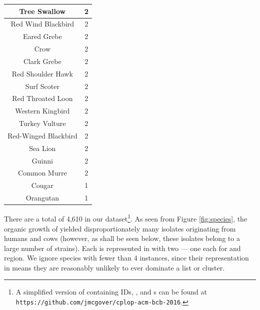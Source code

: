 \begin{longtable}{|c|c|}
Tree Swallow & 2 \\ \hline
Red Wind Blackbird & 2 \\ \hline
Eared Grebe & 2 \\ \hline
Crow & 2 \\ \hline
Clark Grebe & 2 \\ \hline
Red Shoulder Hawk & 2 \\ \hline
Surf Scoter & 2 \\ \hline
Red Throated Loon & 2 \\ \hline
Western Kingbird & 2 \\ \hline
Turkey Vulture & 2 \\ \hline
Red-Winged Blackbird & 2 \\ \hline
Sea Lion & 2 \\ \hline
Guinni & 2 \\ \hline
Common Murre & 2 \\ \hline
Cougar & 1 \\ \hline
Orangutan & 1 \\ \hline

\end{longtable}

There are a total of 4,610 \isols{} in our dataset\footnote{A simplified version of \cplop{} containing \isol{} IDs, \spec{}, and \zscore{}s can be found at \texttt{https://github.com/jmcgover/cplop-acm-bcb-2016}.}. 
As seen from Figure \ref{fig:species}, the organic growth of \cplop{} yielded disproportionately many \ecoli{} isolates originating
from humans and cows (however, as shall be seen below, these isolates belong to a large number of strains). Each \isol{} is represented in \cplop{} with two \pyros{} ---  one each for  and  
region.
We ignore species with fewer than 4 instances, since their representation in \cplop{} means they are reasonably unlikely to ever dominate a \knnlong{} list or cluster.